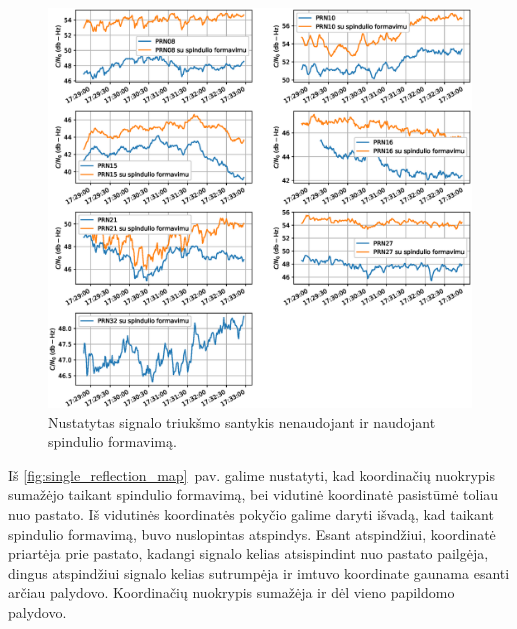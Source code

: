 \documentclass[main.tex]{subfiles}
\begin{document}
\begin{figure}[ht]
    \begin{centering}
    \includegraphics[scale=0.6]{drawings/one_reflection_snr}
    \par\end{centering}
    \protect\caption{\label{fig:single_reflection_snr}Nustatytas signalo triukšmo santykis nenaudojant ir naudojant spindulio formavimą.}
\end{figure}

Iš \ref{fig:single_reflection_map}~pav. galime nustatyti, kad koordinačių nuokrypis sumažėjo taikant spindulio
formavimą, bei vidutinė koordinatė pasistūmė toliau nuo pastato. Iš vidutinės koordinatės pokyčio
galime daryti išvadą, kad taikant spindulio formavimą, buvo nuslopintas atspindys. Esant atspindžiui,
koordinatė priartėja prie pastato, kadangi signalo kelias atsispindint nuo pastato pailgėja, dingus
atspindžiui signalo kelias sutrumpėja ir imtuvo koordinate gaunama esanti arčiau palydovo.
Koordinačių nuokrypis sumažėja ir dėl vieno papildomo palydovo.
\end{document}
